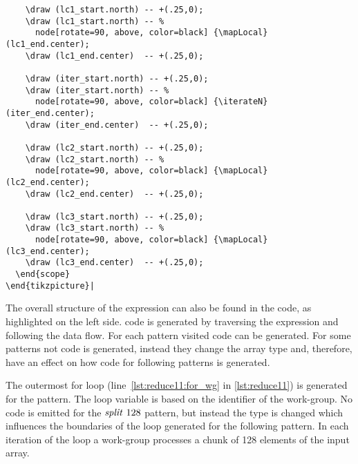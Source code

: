 \begin{lstlisting}
    \draw (lc1_start.north) -- +(.25,0);
    \draw (lc1_start.north) -- %
      node[rotate=90, above, color=black] {\mapLocal} (lc1_end.center);
    \draw (lc1_end.center)  -- +(.25,0);

    \draw (iter_start.north) -- +(.25,0);
    \draw (iter_start.north) -- %
      node[rotate=90, above, color=black] {\iterateN} (iter_end.center);
    \draw (iter_end.center)  -- +(.25,0);

    \draw (lc2_start.north) -- +(.25,0);
    \draw (lc2_start.north) -- %
      node[rotate=90, above, color=black] {\mapLocal} (lc2_end.center);
    \draw (lc2_end.center)  -- +(.25,0);

    \draw (lc3_start.north) -- +(.25,0);
    \draw (lc3_start.north) -- %
      node[rotate=90, above, color=black] {\mapLocal} (lc3_end.center);
    \draw (lc3_end.center)  -- +(.25,0);
  \end{scope}
\end{tikzpicture}|
\end{lstlisting}
%
The overall structure of the expression can also be found in the \OpenCL code, as highlighted on the left side.
\OpenCL code is generated by traversing the expression and following the data flow.
For each pattern visited \OpenCL code can be generated.
For some patterns not code is generated, instead they change the array type and, therefore, have an effect on how code for following patterns is generated.

The outermost for loop (line~\ref{lst:reduce11:for_wg} in \autoref{lst:reduce11}) is generated for the \mapWorkgroup pattern.
The loop variable  is based on the identifier of the work-group.
No code is emitted for the $\splitN\ 128$ pattern, but instead the type is changed which influences the boundaries of the loop generated for the following \mapWorkgroup pattern. 
In each iteration of the loop a work-group processes a chunk of 128 elements of the input array.

